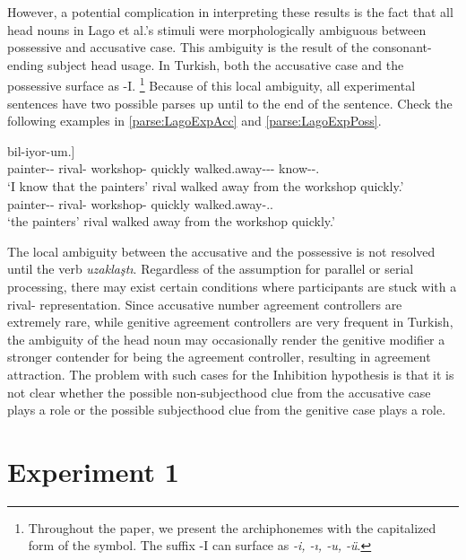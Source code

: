 \documentclass[
  english,
  doc,floatsintext]{apa6}
\begin{document}
However, a potential complication in interpreting these results is the fact that all head nouns in Lago et al.'s stimuli were morphologically ambiguous between possessive and accusative case. This ambiguity is the result of the consonant-ending subject head usage. In Turkish, both the accusative case and the possessive surface as -I. \footnote{Throughout the paper, we present the archiphonemes with the capitalized form of the symbol. The suffix -I can surface as \textit{-i, -ı, -u, -ü}. }
Because of this local ambiguity, all experimental sentences have two possible parses up until to the end of the sentence. Check the following examples in \ref{parse:LagoExpAcc} and \ref{parse:LagoExpPoss}.

\begin{exe}
\ex \label{parse:LagoExpAcc}
\gll [\textsubscript{CP}[\textsubscript{CP}Ressam-lar-{\i}n rakib-i at\"{o}lye-den h{\i}zla uzakla\c{s}-t{\i}ğ-{\i}n-{\i}] bil-iyor-um.]\\
painter-\Pl{}-\Gen{} rival-\Acc{} workshop-\Abl{} quickly walked.away-\Nmlz{}-\Poss{}-\Acc{} know-\Prog{}-\Fsg{}.\\
\glt `I know that the painters' rival walked away from the workshop quickly.'
\ex \label{parse:LagoExpPoss}
\\
painter-\Pl{}-\Gen{} rival-\Poss{} workshop-\Abl{} quickly walked.away-\Pst.\Tsg{}.\\
\glt `the painters' rival walked away from the workshop quickly.'
\end{exe}

The local ambiguity between the accusative and the possessive is not resolved until the verb \emph{uzaklaştı}. Regardless of the assumption for parallel or serial processing, there may exist certain conditions where participants are stuck with a rival-\Acc{} representation. Since accusative number agreement controllers are extremely rare, while genitive agreement controllers are very frequent in Turkish, the ambiguity of the head noun may occasionally render the genitive modifier a stronger contender for being the agreement controller, resulting in agreement attraction. The problem with such cases for the Inhibition hypothesis is that it is not clear whether the possible non-subjecthood clue from the accusative case plays a role or the possible subjecthood clue from the genitive case plays a role.

\hypertarget{experiment-1}{%
\section{Experiment 1}\label{experiment-1}}
\end{document}
